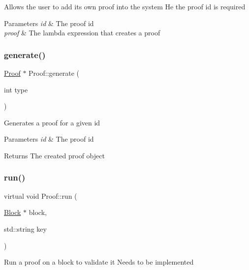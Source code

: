 Allows the user to add its own proof into the system He the proof id is required


\begin{DoxyParams}{Parameters}
{\em id} & The proof id \\
\hline
{\em proof} & The lambda expression that creates a proof \\
\hline
\end{DoxyParams}
\mbox{\label{classProof_a267f0f4587babb59884b5f280e2d54c8}} 
\subsubsection{\texorpdfstring{generate()}{generate()}}
{\footnotesize\ttfamily \mbox{\hyperlink{classProof}{Proof}} $\ast$ Proof\+::generate (\begin{DoxyParamCaption}\item[{int}]{type }\end{DoxyParamCaption})\hspace{0.3cm}{\ttfamily [static]}}

Generates a proof for a given id


\begin{DoxyParams}{Parameters}
{\em id} & The proof id \\
\hline
\end{DoxyParams}
\begin{DoxyReturn}{Returns}
The created proof object 
\end{DoxyReturn}
\mbox{\label{classProof_a8a43fcb7c997da54d627e0f257adb86f}} 
\subsubsection{\texorpdfstring{run()}{run()}}
{\footnotesize\ttfamily virtual void Proof\+::run (\begin{DoxyParamCaption}\item[{\mbox{\hyperlink{classBlock}{Block}} $\ast$}]{block,  }\item[{std\+::string}]{key }\end{DoxyParamCaption})\hspace{0.3cm}{\ttfamily [pure virtual]}}

Run a proof on a block to validate it Needs to be implemented


